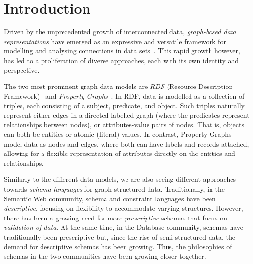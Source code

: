 

\section{Introduction}

Driven by the unprecedented growth of interconnected data, \emph{graph-based
data representations} have emerged as an expressive and versatile framework for
modelling and analysing connections in data sets~\cite{SakrBVIAAAABBDV21}.
This rapid growth however, has led to a proliferation of diverse approaches,
each with its own identity and perspective.

The two most prominent graph data models are \emph{RDF} (Resource Description
Framework)~\cite{CWL14} and \emph{Property Graphs}~\cite{BFVY23}.
In RDF, data is modelled as a collection of triples, each consisting of a
subject, predicate, and object.
Such triples naturally represent either edges in a directed labelled graph
(where the predicates represent relationships between nodes), or
attributes-value pairs of nodes.
That is, objects can both be entities or atomic (literal) values.
In contrast, Property Graphs model data as nodes and edges, where both can have
labels and records attached, allowing for a flexible representation of
attributes directly on the entities and relationships.

Similarly to the different data models, we are also seeing different approaches
towards \emph{schema languages} for graph-structured data.
Traditionally, in the Semantic Web community, schema and constraint languages
have been \emph{descriptive}, focusing on flexibility to accommodate varying
structures.
However, there has been a growing need for more \emph{prescriptive} schemas
that focus on \emph{validation of data}.
At the same time, in the Database community, schemas have traditionally been
prescriptive but, since the rise of semi-structured data, the demand for
descriptive schemas has been growing.
Thus, the philosophies of schemas in the two communities have been growing
closer together.

